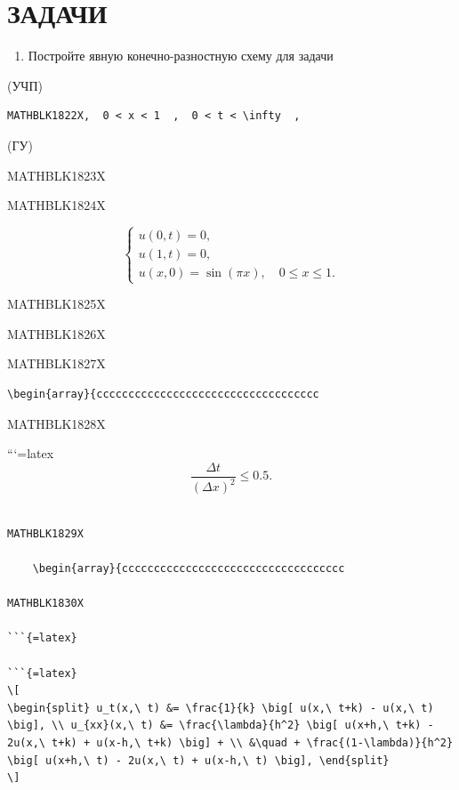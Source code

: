 \documentclass[
  ukrainian,
]{article}
\providecommand{\tightlist}{%
  \setlength{\itemsep}{0pt}\setlength{\parskip}{0pt}}
\begin{document}
\section{ЗАДАЧИ}\label{ux437ux430ux434ux430ux447ux438-6}

\begin{enumerate}
\def\labelenumi{\arabic{enumi}.}
\tightlist
\item
  Постройте явную конечно-разностную схему для задачи
\end{enumerate}

(УЧП)

\begin{verbatim}
MATHBLK1822X,  0 < x < 1  ,  0 < t < \infty  ,
\end{verbatim}

(ГУ)

MATHBLK1823X

MATHBLK1824X

\[
\begin{cases} u(0, t) = 0, \\ u(1, t) = 0, \\ u(x, 0) = \sin(\pi x), \quad 0 \le x \le 1. \end{cases}
\]

MATHBLK1825X

MATHBLK1826X

MATHBLK1827X

\begin{verbatim}
\begin{array}{ccccccccccccccccccccccccccccccccccc
\end{verbatim}

MATHBLK1828X

```{=latex}
\[
\frac{\Delta t}{(\Delta x)^2} \leqslant 0.5.
\]

\begin{verbatim}

MATHBLK1829X

    \begin{array}{ccccccccccccccccccccccccccccccccccc

MATHBLK1830X

```{=latex}

```{=latex}
\[
\begin{split} u_t(x,\ t) &= \frac{1}{k} \big[ u(x,\ t+k) - u(x,\ t) \big], \\ u_{xx}(x,\ t) &= \frac{\lambda}{h^2} \big[ u(x+h,\ t+k) - 2u(x,\ t+k) + u(x-h,\ t+k) \big] + \\ &\quad + \frac{(1-\lambda)}{h^2} \big[ u(x+h,\ t) - 2u(x,\ t) + u(x-h,\ t) \big], \end{split}
\]
\end{verbatim}
\end{document}

